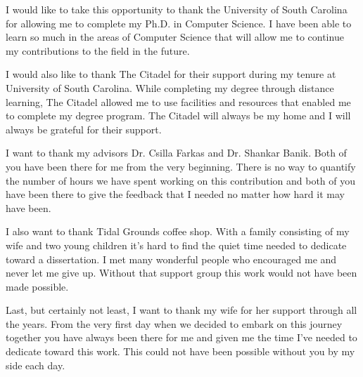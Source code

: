I would like to take this opportunity to thank the University of South Carolina for allowing me to complete my Ph.D. in Computer Science. I have been able to learn so much in the areas of Computer Science that will allow me to continue my contributions to the field in the future.

I would also like to thank The Citadel for their support during my tenure at University of South Carolina. While completing my degree through distance learning, The Citadel allowed me to use facilities and resources that enabled me to complete my degree program. The Citadel will always be my home and I will always be grateful for their support.

I want to thank my advisors Dr. Csilla Farkas and Dr. Shankar Banik. Both of you have been there for me from the very beginning. There is no way to quantify the number of hours we have spent working on this contribution and both of you have been there to give the feedback that I needed no matter how hard it may have been.

I also want to thank Tidal Grounds coffee shop. With a family consisting of my wife and two young children it's hard to find the quiet time needed to dedicate toward a dissertation. I met many wonderful people who encouraged me and never let me give up. Without that support group this work would not have been made possible.

Last, but certainly not least, I want to thank my wife for her support through all the years. From the very first day when we decided to embark on this journey together you have always been there for me and given me the time I've needed to dedicate toward this work. This could not have been possible without you by my side each day.